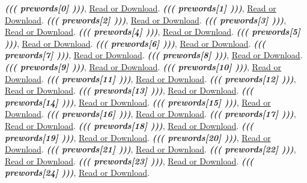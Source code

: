 \documentclass{article}
\begin{document}
\begin{thebibliography}{99}

\emph{\textbf{((( prewords[0] )))}}, \href{((( lander[0] ))) }{Read or Download}.
\emph{\textbf{((( prewords[1] )))}}, \href{((( lander[1] )))}{Read or Download}.
\emph{\textbf{((( prewords[2] )))}}, \href{((( lander[2] )))}{Read or Download}.
\emph{\textbf{((( prewords[3] )))}}, \href{((( lander[3] )))}{Read or Download}.
\emph{\textbf{((( prewords[4] )))}}, \href{((( lander[4] )))}{Read or Download}.
\emph{\textbf{((( prewords[5] )))}}, \href{((( lander[5] )))}{Read or Download}.
\emph{\textbf{((( prewords[6] )))}}, \href{((( lander[6] )))}{Read or Download}.
\emph{\textbf{((( prewords[7] )))}}, \href{((( lander[7] )))}{Read or Download}.
\emph{\textbf{((( prewords[8] )))}}, \href{((( lander[8] )))}{Read or Download}.
\emph{\textbf{((( prewords[9] )))}}, \href{((( lander[9] )))}{Read or Download}.
\emph{\textbf{((( prewords[10] )))}}, \href{((( lander[10] )))}{Read or Download}.
\emph{\textbf{((( prewords[11] )))}}, \href{((( lander[11] )))}{Read or Download}.
\emph{\textbf{((( prewords[12] )))}}, \href{((( lander[12] )))}{Read or Download}.
\emph{\textbf{((( prewords[13] )))}}, \href{((( lander[13] )))}{Read or Download}.
\emph{\textbf{((( prewords[14] )))}}, \href{((( lander[14] )))}{Read or Download}.
\emph{\textbf{((( prewords[15] )))}}, \href{((( lander[15] )))}{Read or Download}.
\emph{\textbf{((( prewords[16] )))}}, \href{((( lander[16] )))}{Read or Download}.
\emph{\textbf{((( prewords[17] )))}}, \href{((( lander[17] )))}{Read or Download}.
\emph{\textbf{((( prewords[18] )))}}, \href{((( lander[18] )))}{Read or Download}.
\emph{\textbf{((( prewords[19] )))}}, \href{((( lander[19] )))}{Read or Download}.
\emph{\textbf{((( prewords[20] )))}}, \href{((( lander[20] )))}{Read or Download}.
\emph{\textbf{((( prewords[21] )))}}, \href{((( lander[21] )))}{Read or Download}.
\emph{\textbf{((( prewords[22] )))}}, \href{((( lander[22] )))}{Read or Download}.
\emph{\textbf{((( prewords[23] )))}}, \href{((( lander[23] )))}{Read or Download}.
\emph{\textbf{((( prewords[24] )))}}, \href{((( lander[24] )))}{Read or Download}.

\end{thebibliography}
\end{document}
